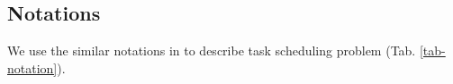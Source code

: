 \subsection{Notations}
We use the similar notations in \cite{LP-paper} to describe task scheduling problem (Tab. \ref{tab-notation}). 
